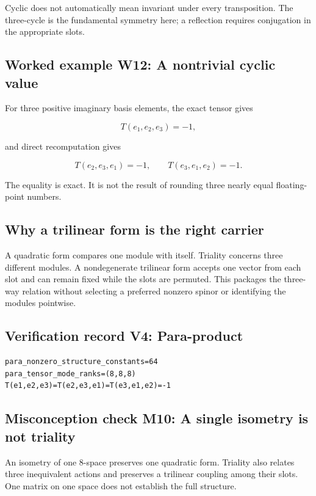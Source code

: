 \documentclass[11pt]{article}
\begin{document}
Cyclic does not automatically mean invariant under every transposition. The three-cycle is the fundamental symmetry here; a reflection requires conjugation in the appropriate slots.

\subsection{Worked example W12: A nontrivial cyclic value}

For three positive imaginary basis elements, the exact tensor gives

\[
T(e_1,e_2,e_3)=-1,
\]

and direct recomputation gives

\[
T(e_2,e_3,e_1)=-1,
\qquad
T(e_3,e_1,e_2)=-1.
\]

The equality is exact. It is not the result of rounding three nearly equal floating-point numbers.

\subsection{Why a trilinear form is the right carrier}

A quadratic form compares one module with itself. Triality concerns three different modules. A nondegenerate trilinear form accepts one vector from each slot and can remain fixed while the slots are permuted. This packages the three-way relation without selecting a preferred nonzero spinor or identifying the modules pointwise.

\subsection{Verification record V4: Para-product}

\begin{Verbatim}[fontsize=\small]
para_nonzero_structure_constants=64
para_tensor_mode_ranks=(8,8,8)
T(e1,e2,e3)=T(e2,e3,e1)=T(e3,e1,e2)=-1
\end{Verbatim}

\subsection{Misconception check M10: A single isometry is not triality}

An isometry of one 8-space preserves one quadratic form. Triality also relates three inequivalent actions and preserves a trilinear coupling among their slots. One matrix on one space does not establish the full structure.
\end{document}
